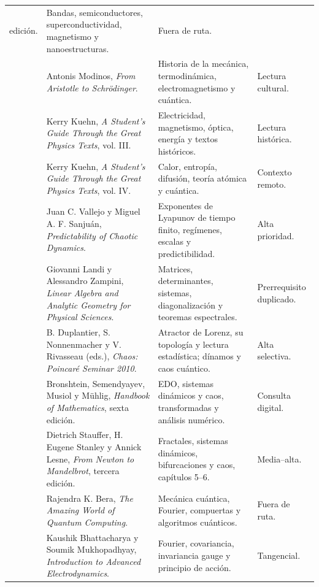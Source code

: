 \begin{longtable}{@{}L{3.10cm}L{4.35cm}L{4.35cm}L{2.70cm}@{}}
edición. &
Bandas, semiconductores, superconductividad, magnetismo y nanoestructuras. &
Fuera de ruta. \\
 &
Antonis Modinos, \emph{From Aristotle to Schrödinger}. &
Historia de la mecánica, termodinámica, electromagnetismo y cuántica. &
Lectura cultural. \\
 &
Kerry Kuehn, \emph{A Student's Guide Through the Great Physics Texts}, vol.
III. &
Electricidad, magnetismo, óptica, energía y textos históricos. &
Lectura histórica. \\
 &
Kerry Kuehn, \emph{A Student's Guide Through the Great Physics Texts}, vol.
IV. &
Calor, entropía, difusión, teoría atómica y cuántica. & Contexto remoto. \\
 &
Juan C. Vallejo y Miguel A. F. Sanjuán, \emph{Predictability of Chaotic
Dynamics}. &
Exponentes de Lyapunov de tiempo finito, regímenes, escalas y predictibilidad. &
Alta prioridad. \\
 &
Giovanni Landi y Alessandro Zampini, \emph{Linear Algebra and Analytic Geometry
for Physical Sciences}. &
Matrices, determinantes, sistemas, diagonalización y teoremas espectrales. &
Prerrequisito duplicado. \\
 &
B. Duplantier, S. Nonnenmacher y V. Rivasseau (eds.), \emph{Chaos: Poincaré
Seminar 2010}. &
Atractor de Lorenz, su topología y lectura estadística; dínamos y caos
cuántico. & Alta selectiva. \\
 &
Bronshtein, Semendyayev, Musiol y Mühlig, \emph{Handbook of Mathematics}, sexta
edición. &
EDO, sistemas dinámicos y caos, transformadas y análisis numérico. &
Consulta digital. \\
 &
Dietrich Stauffer, H. Eugene Stanley y Annick Lesne, \emph{From Newton to
Mandelbrot}, tercera edición. &
Fractales, sistemas dinámicos, bifurcaciones y caos, capítulos 5--6. &
Media--alta. \\
 &
Rajendra K. Bera, \emph{The Amazing World of Quantum Computing}. &
Mecánica cuántica, Fourier, compuertas y algoritmos cuánticos. &
Fuera de ruta. \\
 &
Kaushik Bhattacharya y Soumik Mukhopadhyay, \emph{Introduction to Advanced
Electrodynamics}. &
Fourier, covariancia, invariancia gauge y principio de acción. & Tangencial. \\

\end{longtable}
